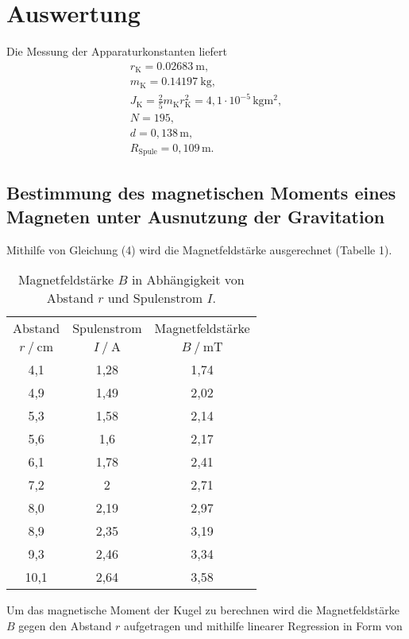 \section{Auswertung}
\label{sec:Auswertung}

Die Messung der Apparaturkonstanten liefert 
\begin{align*}
  r_\text{K} = \SI{0.02683}{\metre}, \\ 
  m_\text{K} = \SI{0.14197}{\kilo\gram}, \\
  J_\text{K} = \frac{2}{5} m_\text{K} r_\text{K}^2 = 4,1 \cdot 10^{-5}\,\si{\kilo\gram\meter\squared}, \\
  N = 195, \\
  d = 0,138 \,\si{\meter}, \\
  R_\text{Spule} = 0,109 \,\si{\meter}.
\end{align*}

\subsection{Bestimmung des magnetischen Moments eines Magneten unter Ausnutzung der Gravitation}
Mithilfe von Gleichung (4) wird die Magnetfeldstärke ausgerechnet (Tabelle 1).
\begin{table}
\centering
\caption{Magnetfeldstärke $B$ in Abhängigkeit von Abstand $r$ und Spulenstrom $I$.}
\label{tab:bfeld}
\begin{tabular}{c c c}
\toprule
\multicolumn{1}{c}{Abstand} & \multicolumn{1}{c}{Spulenstrom} & \multicolumn{1}{c}{Magnetfeldstärke} \\
{$r\:/\:\si{\centi\meter}$} & {$I\:/\:\si{\ampere}$} & $B\:/\:\si{\milli\tesla}$\\
\midrule
4,1 & 1,28 & 1,74 \\
4,9 & 1,49 & 2,02 \\
5,3 & 1,58 & 2,14 \\
5,6 & 1,6 & 2,17 \\
6,1 & 1,78 & 2,41 \\
7,2 & 2 & 2,71 \\
8,0 & 2,19 & 2,97 \\
8,9 & 2,35 & 3,19 \\
9,3 & 2,46 & 3,34 \\
10,1 & 2,64 & 3,58 \\
\bottomrule
\end{tabular}
\end{table}


\noindent Um das magnetische Moment der Kugel zu berechnen wird die Magnetfeldstärke $B$ gegen den Abstand 
$r$ aufgetragen und mithilfe linearer Regression in Form von 

